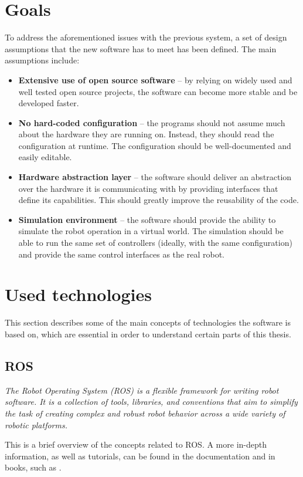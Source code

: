 \documentclass[english,inz,shortabstract]{iithesis}
\begin{document}
\section{Goals}
To address the aforementioned issues with the previous system, a set of design assumptions that the new software has to meet has been defined. The main assumptions include:

\begin{itemize}
    \item \textbf{Extensive use of open source software} -- by relying on widely used and well tested open source projects, the software can become more stable and be developed faster.
    \item \textbf{No hard-coded configuration} -- the programs should not assume much about the hardware they are running on. Instead, they should read the configuration at runtime. The configuration should be well-documented and easily editable.
    \item \textbf{Hardware abstraction layer} -- the software should deliver an abstraction over the hardware it is communicating with by providing interfaces that define its capabilities. This should greatly improve the reusability of the code. 
    \item \textbf{Simulation environment} -- the software should provide the ability to simulate the robot operation in a virtual world. The simulation should be able to run the same set of controllers (ideally, with the same configuration) and provide the same control interfaces as the real robot.
\end{itemize}


\section{Used technologies}
This section describes some of the main concepts of technologies the software is based on, which are essential in order to understand certain parts of this thesis.

    \subsection{ROS}
    \textit{The Robot Operating System (ROS) is a flexible framework for writing robot software. It is a collection of tools, libraries, and conventions that aim to simplify the task of creating complex and robust robot behavior across a wide variety of robotic platforms.}
    \cite{ros:about}

    This is a brief overview of the concepts related to ROS. A more in-depth information, as well as tutorials, can be found in the documentation \cite{ros:documentation} and in books, such as \cite{ros:mastering}.
\end{document}

